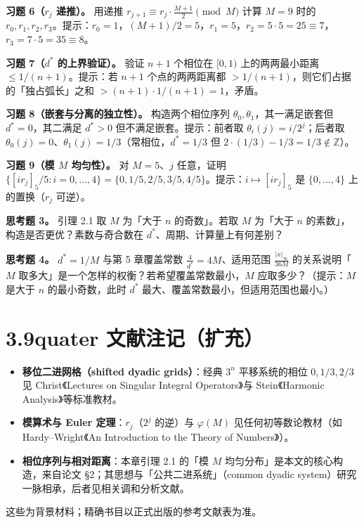 \documentclass[a4paper,11pt,openany]{ctexbook}
\numberwithin{equation}{chapter}
\numberwithin{figure}{chapter}
\numberwithin{table}{chapter}
\begin{document}
\textbf{习题 6（$r_j$ 递推）。} 用递推 $r_{j+1}\equiv r_j\cdot\frac{M+1}{2}\pmod M$ 计算 $M=9$ 时的 $r_0,r_1,r_2,r_3$。提示：$r_0=1$，$(M+1)/2=5$，$r_1=5$，$r_2=5\cdot5=25\equiv7$，$r_3=7\cdot5=35\equiv8$。

\textbf{习题 7（$d^*$ 的上界验证）。} 验证 $n+1$ 个相位在 $[0,1)$ 上的两两最小距离 $\le1/(n+1)$。提示：若 $n+1$ 个点的两两距离都 $>1/(n+1)$，则它们占据的「独占弧长」之和 $>(n+1)\cdot1/(n+1)=1$，矛盾。

\textbf{习题 8（嵌套与分离的独立性）。} 构造两个相位序列 $\theta_0,\theta_1$，其一满足嵌套但 $d^*=0$，其二满足 $d^*>0$ 但不满足嵌套。提示：前者取 $\theta_i(j)=i/2^j$；后者取 $\theta_0(j)=0$、$\theta_1(j)=1/3$（常相位，$d^*=1/3$ 但 $2\cdot(1/3)-1/3=1/3\notin\mathbb Z$）。

\textbf{习题 9（模 $M$ 均匀性）。} 对 $M=5$、$j$ 任意，证明 $\{[ir_j]_5/5:i=0,\dots,4\}=\{0,1/5,2/5,3/5,4/5\}$。提示：$i\mapsto[ir_j]_5$ 是 $\{0,\dots,4\}$ 上的置换（$r_j$ 可逆）。

\textbf{思考题 3。} 引理 2.1 取 $M$ 为「大于 $n$ 的奇数」。若取 $M$ 为「大于 $n$ 的素数」，构造是否更优？素数与奇合数在 $d^*$、周期、计算量上有何差别？

\textbf{思考题 4。} $d^*=1/M$ 与第 5 章覆盖常数 $\frac4{d^*}=4M$、适用范围 $\frac{|x|_\infty}{36M}$ 的关系说明「$M$ 取多大」是一个怎样的权衡？若希望覆盖常数最小，$M$ 应取多少？（提示：$M$ 是大于 $n$ 的最小奇数，此时 $d^*$ 最大、覆盖常数最小，但适用范围也最小。）

\section{3.9quater 文献注记（扩充）}

\begin{itemize}
\item \textbf{移位二进网格（shifted dyadic grids）}：经典 $3^n$ 平移系统的相位 $0,1/3,2/3$ 见 Christ《Lectures on Singular Integral Operators》与 Stein《Harmonic Analysis》等标准教材。
\item \textbf{模算术与 Euler 定理}：$r_j$（$2^j$ 的逆）与 $\varphi(M)$ 见任何初等数论教材（如 Hardy–Wright《An Introduction to the Theory of Numbers》）。
\item \textbf{相位序列与相对距离}：本章引理 2.1 的「模 $M$ 均匀分布」是本文的核心构造，来自论文 §2；其思想与「公共二进系统」（common dyadic system）研究一脉相承，后者见相关调和分析文献。
\end{itemize}

这些为背景材料；精确书目以正式出版的参考文献表为准。
\end{document}

